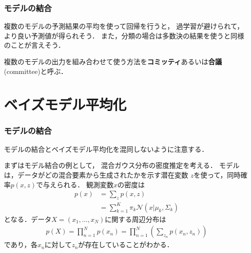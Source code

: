 \documentclass[10pt,hyperref={unicode}]{beamer}
\newcommand{\parentheses}[1]{\left(#1\right)}
\begin{document}
\begin{frame}
\frametitle{モデルの結合}
    複数のモデルの予測結果の平均を使って回帰を行うと，
    過学習が避けられて，より良い予測値が得られそう．
    また，分類の場合は多数決の結果を使うと同様のことが言えそう．

    \bigskip

    複数のモデルの出力を組み合わせて使う方法を\textbf{コミッティ}あるいは\textbf{合議}(committee)と呼ぶ．
\end{frame}

\section{ベイズモデル平均化}
\begin{frame}
\frametitle{モデルの結合}
モデルの結合とベイズモデル平均化を混同しないように注意する．

\bigskip

まずはモデル結合の例として，
混合ガウス分布の密度推定を考える．
モデルは，データがどの混合要素から生成されたかを示す潜在変数
$z$を使って，同時確率$p\parentheses{x,z}$で与えられる．
観測変数$x$の密度は
\begin{align}
    p\parentheses{x}
    &= \sum_{z} p\parentheses{x,z} \tag{14.3} \\
    &= \sum_{k = 1}^K \pi_k \mathcal{N}\parentheses{x|\mu_k,\varSigma_k} \tag{14.4}
\end{align}
となる．データ$X = \parentheses{x_1,\ldots,x_N}$に関する周辺分布は
\begin{align}
    p\parentheses{X} = \prod_{n = 1}^N p\parentheses{x_n}
    = \prod_{n = 1}^N \parentheses{\sum_{z_n}p\parentheses{x_n,z_n}}
    \tag{14.5}
\end{align}
であり，各$x_n$に対して$z_n$が存在していることがわかる．

\end{frame}
\end{document}

